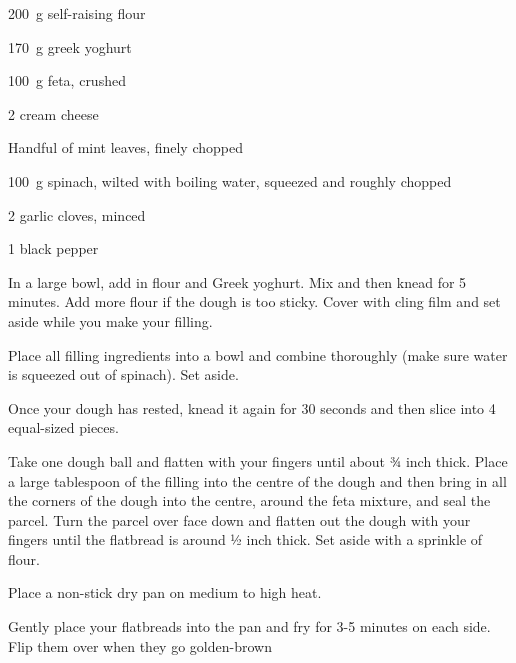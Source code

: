 \label{recipe:filled_pittas}


\begin{ingredients}

	\item \SI{200}{\gram} self-raising flour
	\item \SI{170}{\gram} greek yoghurt
	\item \SI{100}{\gram} feta, crushed
	\item \SI{2}{\tablespoon} cream cheese
	\item Handful of mint leaves, finely chopped
	\item \SI{100}{\gram} spinach, wilted with boiling water, squeezed and roughly chopped
	\item 2 garlic cloves, minced
	\item \SI{1}{\teaspoon} black pepper

\end{ingredients}


\begin{method}
	In a large bowl, add in flour and Greek yoghurt. Mix and then knead
for 5 minutes. Add more flour if the dough is too sticky. Cover with
cling film and set aside while you make your filling.

Place all filling ingredients into a bowl and combine thoroughly
(make sure water is squeezed out of spinach). Set aside.

Once your dough has rested, knead it again for 30 seconds and then
slice into 4 equal-sized pieces.

Take one dough ball and flatten with your fingers until about ¾ inch
thick. Place a large tablespoon of the filling into the centre of the
dough and then bring in all the corners of the dough into the centre,
around the feta mixture, and seal the parcel. Turn the parcel over
face down and flatten out the dough with your fingers until the
flatbread is around ½ inch thick. Set aside with a sprinkle of flour.

Place a non-stick dry pan on medium to high heat.

Gently place your flatbreads into the pan and fry for 3-5 minutes on
each side. Flip them over when they go golden-brown
  
\end{method}




